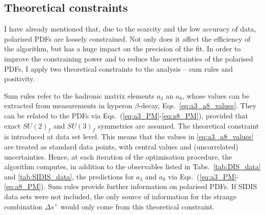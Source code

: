 \subsection{Theoretical constraints}
I have already mentioned that, due to the scarcity and the low accuracy of data, polarised PDFs are loosely constrained. Not only does it affect the efficiency of the algorithm, but has a huge impact on the precision of the fit. In order to improve the constraining power and to reduce the uncertainties of the polarised PDFs, I apply two theoretical constraints to the analysis -- sum rules and positivity.%

Sum rules refer to the hadronic matrix elements $a_3$ an $a_8$, whose values can be extracted from measurements in hyperon $\beta$-decay, Eqs.~\eqref{eq:a3_a8_values}. They can be related to the PDFs via Eqs.~(\ref{eq:a3_PM}-\ref{eq:a8_PM}), provided that exact $SU(2)_f$ and $SU(3)_f$ symmetries are assumed. The theoretical constraint is introduced at data set level. This means that the values in \eqref{eq:a3_a8_values} are treated as standard data points, with central values and (uncorrelated) uncertainties. Hence, at each iteration of the optimisation procedure, the algorithm computes, in addition to the observables listed in Tabs.~\ref{tab:DIS_data} and \ref{tab:SIDIS_data}, the predictions for $a_3$ and $a_8$ via Eqs.~(\ref{eq:a3_PM}-\ref{eq:a8_PM}). Sum rules provide further information on polarised PDFs. If SIDIS data sets were not included, the only source of information for the strange combination $\Delta s^+$ would only come from this theoretical constraint.%

